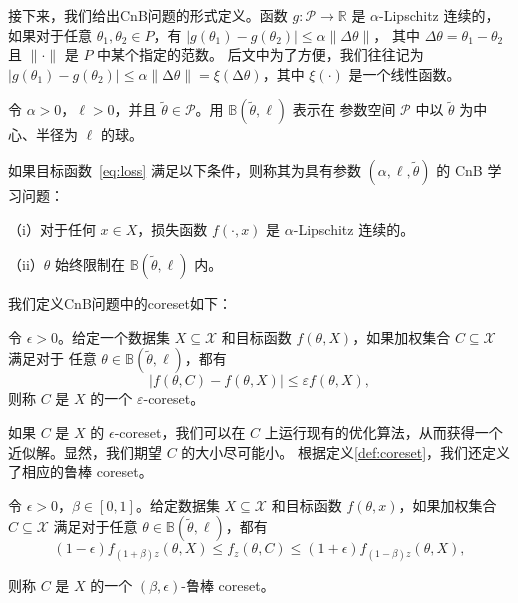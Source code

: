 接下来，我们给出CnB问题的形式定义。函数 $g: \mathcal{P} \rightarrow \mathbb{R}$ 是 $\alpha$-Lipschitz 连续的，
如果对于任意 $\theta_1, \theta_2 \in P$，有 $|g(\theta_1) - g(\theta_2)| \leq \alpha \|\Delta \theta\|$，
其中 $\Delta \theta = \theta_1 - \theta_2$ 且 $\|\cdot\|$ 是 $P$ 中某个指定的范数。
后文中为了方便，我们往往记为$|g(\theta_1) - g(\theta_2)| \leq \alpha \|\increment \theta\| = \xi(\increment \theta)$，其中 $\xi(\cdot)$ 是一个线性函数。


\begin{definition}[CnB 问题]
  令 $\alpha > 0$，$\ell > 0$，并且 $\tilde{\theta} \in \mathcal{P}$。用 $\mathbb{B}(\tilde{\theta}, \ell)$ 表示在
  参数空间 $\mathcal{P}$ 中以 $\tilde{\theta}$ 为中心、半径为 $\ell$ 的球。

如果目标函数~\eqref{eq:loss} 满足以下条件，则称其为具有参数 $(\alpha, \ell, \tilde{\theta})$ 的 CnB 学习问题：

（i）对于任何 $x \in X$，损失函数 $f(\cdot, x)$ 是 $\alpha$-Lipschitz 连续的。

（ii）$\theta$ 始终限制在 $\mathbb{B}(\tilde{\theta}, \ell)$ 内。
\label{def:CnB}
\end{definition}

我们定义CnB问题中的coreset如下：

\begin{definition}
  令 $\epsilon > 0$。给定一个数据集 $X \subseteq \mathcal{X}$ 
  和目标函数 $f(\theta, X)$，如果加权集合 $C \subseteq \mathcal{X}$ 满足对于
  任意 $\theta \in \mathbb{B}(\tilde{\theta}, \ell)$，都有
  \begin{equation*}
  |f(\theta, C) - f(\theta, X)| \leq \varepsilon f(\theta, X),
  \end{equation*}
则称 $C$ 是 $X$ 的一个 $\varepsilon$-coreset。
\label{def:coreset}
\end{definition}


如果 $C$ 是 $X$ 的 $\epsilon$-coreset，我们可以在 $C$ 上运行现有的优化算法，从而获得一个近似解。显然，我们期望 $C$ 的大小尽可能小。
根据定义\ref{def:coreset}，我们还定义了相应的鲁棒 coreset。


\begin{definition}[鲁棒coreset]
  令 $\epsilon > 0$，$\beta \in [0, 1]$。给定数据集 $X \subseteq \mathcal{X}$ 
  和目标函数 $f(\theta, x)$，如果加权集合 $C \subseteq \mathcal{X}$ 满足对于任意 $\theta \in \mathbb{B}(\tilde{\theta}, \ell)$，都有
  \begin{equation*}
  (1 - \epsilon) f_{(1+\beta)z}(\theta, X) \leq f_z(\theta, C) \leq (1 + \epsilon) f_{(1-\beta)z}(\theta, X),
  \end{equation*}

则称 $C$ 是 $X$ 的一个 $(\beta, \epsilon)$-鲁棒 coreset。
\label{def:robust coreset}
\end{definition}


